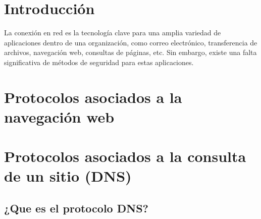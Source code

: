 
\section{Introducción}
La conexión en red es la tecnología clave para una amplia variedad 
de aplicaciones dentro de una organización, como correo electrónico, 
transferencia de archivos, navegación web, consultas de páginas, etc.
Sin embargo, existe una falta significativa de métodos de seguridad 
para estas aplicaciones.
\section{Protocolos asociados a la navegación web}
    


\section{Protocolos asociados a la consulta de un sitio (DNS)}
    \subsection{¿Que es el protocolo DNS?} 






